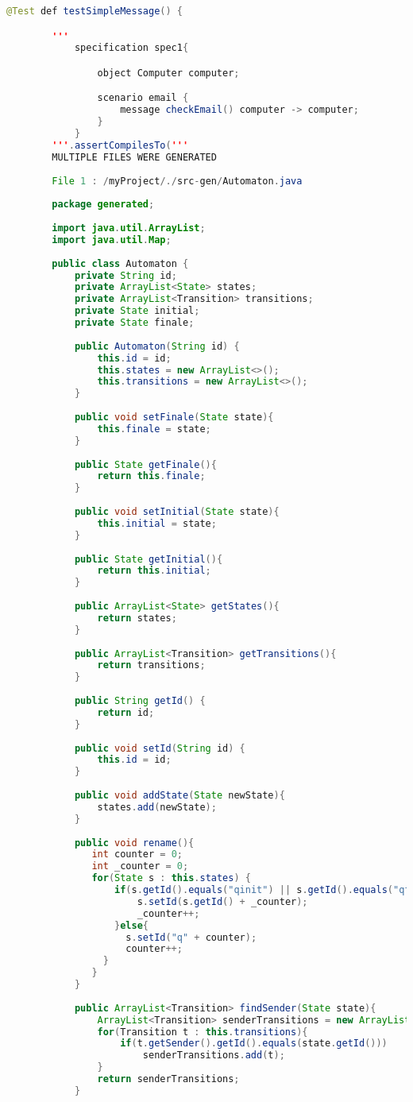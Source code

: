\begin{lstlisting}[language=java, caption={példa unit teszteset.},captionpos=b]
@Test def testSimpleMessage() {

		'''
			specification spec1{

				object Computer computer;

				scenario email {
					message checkEmail() computer -> computer;
				}
			}
		'''.assertCompilesTo('''
		MULTIPLE FILES WERE GENERATED
		
		File 1 : /myProject/./src-gen/Automaton.java
		
		package generated;
					
		import java.util.ArrayList;
		import java.util.Map;
		
		public class Automaton {
			private String id;
			private ArrayList<State> states;
			private ArrayList<Transition> transitions;
			private State initial;
			private State finale;
		
			public Automaton(String id) {
				this.id = id;
				this.states = new ArrayList<>();
				this.transitions = new ArrayList<>();
			}
			
			public void setFinale(State state){
				this.finale = state;
			}
			
			public State getFinale(){
				return this.finale;
			}
			
			public void setInitial(State state){
				this.initial = state;
			}
			
			public State getInitial(){
				return this.initial;
			}	
			
			public ArrayList<State> getStates(){
				return states;
			}
			
			public ArrayList<Transition> getTransitions(){
				return transitions;
			}
		
			public String getId() {
				return id;
			}
		
			public void setId(String id) {
				this.id = id;
			}
		
			public void addState(State newState){
				states.add(newState);
			}
			
			public void rename(){
			   int counter = 0;
			   int _counter = 0;
			   for(State s : this.states) {
				   if(s.getId().equals("qinit") || s.getId().equals("qfinal") || s.getId().equals("qaccepting")){
					   s.setId(s.getId() + _counter);
					   _counter++;
				   }else{
					 s.setId("q" + counter);
					 counter++;
				 }
			   }  
			}
			
			public ArrayList<Transition> findSender(State state){
				ArrayList<Transition> senderTransitions = new ArrayList<Transition>();
				for(Transition t : this.transitions){
					if(t.getSender().getId().equals(state.getId()))
						senderTransitions.add(t);
				}	
				return senderTransitions;
			}
			

\end{lstlisting}

